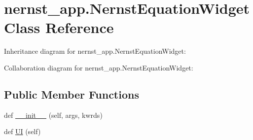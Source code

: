 \hypertarget{classnernst__app_1_1NernstEquationWidget}{}\section{nernst\+\_\+app.\+Nernst\+Equation\+Widget Class Reference}
\label{classnernst__app_1_1NernstEquationWidget}


Inheritance diagram for nernst\+\_\+app.\+Nernst\+Equation\+Widget\+:


Collaboration diagram for nernst\+\_\+app.\+Nernst\+Equation\+Widget\+:
\subsection*{Public Member Functions}
\begin{DoxyCompactItemize}
\item 
def \hyperlink{classnernst__app_1_1NernstEquationWidget_a057e6f0d2c54065bbca9a3c7c2a87868}{\+\_\+\+\_\+init\+\_\+\+\_\+} (self, args, kwrds)
\item 
def \hyperlink{classnernst__app_1_1NernstEquationWidget_a883d90598b1a75b6b4f9eac8f31e39fa}{UI} (self)
\end{DoxyCompactItemize}
